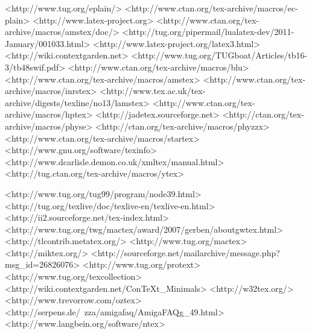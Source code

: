 	<http://www.tug.org/eplain/>
	<http://www.ctan.org/tex-archive/macros/ec-plain>
	<http://www.latex-project.org>
	<http://www.ctan.org/tex-archive/macros/amstex/doc/>
	<http://tug.org/pipermail/lualatex-dev/2011-January/001033.html>
	<http://www.latex-project.org/latex3.html>
	<http://wiki.contextgarden.net>
	<http://www.tug.org/TUGboat/Articles/tb16-3/tb48swif.pdf>
	<http://www.ctan.org/tex-archive/macros/blu>
	<http://www.ctan.org/tex-archive/macros/amstex>
	<http://www.ctan.org/tex-archive/macros/inrstex>
	<http://www.tex.ac.uk/tex-archive/digests/texline/no13/lamstex>
	<http://www.ctan.org/tex-archive/macros/hptex>
	<http://jadetex.sourceforge.net>
	<http://ctan.org/tex-archive/macros/physe>
	<http://ctan.org/tex-archive/macros/phyzzx>
	<http://www.ctan.org/tex-archive/macros/startex>
	<http://www.gnu.org/software/texinfo>
	<http://www.dcarlisle.demon.co.uk/xmltex/manual.html>
	<http://tug.ctan.org/tex-archive/macros/ytex>

	<http://www.tug.org/tug99/program/node39.html>
	<http://tug.org/texlive/doc/texlive-en/texlive-en.html>
	<http://ii2.sourceforge.net/tex-index.html>
	<http://www.tug.org/twg/mactex/award/2007/gerben/aboutgwtex.html>
	<http://tlcontrib.metatex.org/>
	<http://www.tug.org/mactex>
	<http://miktex.org/>
	<http://sourceforge.net/mailarchive/message.php?msg_id=26826076>
	<http://www.tug.org/protext>
	<http://www.tug.org/texcollection>
	<http://wiki.contextgarden.net/ConTeXt_Minimals>
	<http://w32tex.org/>
	<http://www.trevorrow.com/oztex>
	<http://serpens.de/~zza/amigafaq/AmigaFAQg_49.html>
	<http://www.langbein.org/software/ntex>

